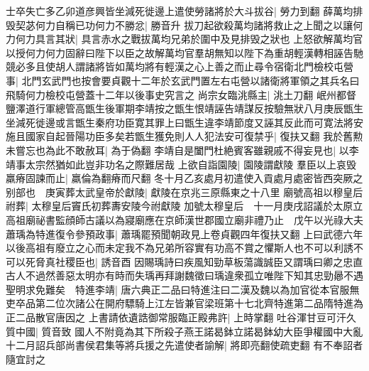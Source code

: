 士卒失亡多乙卯道彦興皆坐減死徙邊上遣使勞諸將於大斗拔谷|{
	勞力到翻}
薛萬均排毁契苾何力自稱已功何力不勝忿|{
	勝音升}
拔刀起欲殺萬均諸將救止之上聞之以讓何力何力具言其狀|{
	具言赤水之戰拔萬均兄弟於圍中及見排毁之狀也}
上怒欲解萬均官以授何力何力固辭曰陛下以臣之故解萬均官羣胡無知以陛下為重胡輕漢轉相誣告馳競必多且使胡人謂諸將皆如萬均將有輕漢之心上善之而止尋令宿衛北門檢校屯營事|{
	北門玄武門也按會要貞觀十二年於玄武門置左右屯營以諸衛將軍領之其兵名曰飛騎何力檢校屯營蓋十二年以後事史究言之}
尚宗女臨洮縣主|{
	洮土刀翻}
岷州都督鹽澤道行軍總管高甑生後軍期李靖按之甑生恨靖誣告靖謀反按驗無狀八月庚辰甑生坐減死徙邊或言甑生秦府功臣寛其罪上曰甑生違李靖節度又誣其反此而可寛法將安施且國家自起晉陽功臣多矣若甑生獲免則人人犯法安可復禁乎|{
	復扶又翻}
我於舊勲未嘗忘也為此不敢赦耳|{
	為于偽翻}
李靖自是闔門杜絶賓客雖親戚不得妄見也|{
	以李靖事太宗然猶如此豈非功名之際難居哉}
上欲自詣園陵|{
	園陵謂獻陵}
羣臣以上哀毁羸瘠固諫而止|{
	羸倫為翻瘠而尺翻}
冬十月乙亥處月初遣使入貢處月處密皆西突厥之别部也　庚寅葬太武皇帝於獻陵|{
	獻陵在京兆三原縣東之十八里}
廟號高祖以穆皇后祔葬|{
	太穆皇后竇氏初葬夀安陵今祔獻陵}
加號太穆皇后　十一月庚戌詔議於太原立高祖廟祕書監顔師古議以為寢廟應在京師漢世郡國立廟非禮乃止　戊午以光祿大夫蕭瑀為特進復令參預政事|{
	蕭瑀罷預聞朝政見上卷貞觀四年復扶又翻}
上曰武德六年以後高祖有廢立之心而未定我不為兄弟所容實有功高不賞之懼斯人也不可以利誘不可以死脅真社稷臣也|{
	誘音酉}
因賜瑀詩曰疾風知勁草板蕩識誠臣又謂瑀曰卿之忠直古人不過然善惡太明亦有時而失瑀再拜謝魏徵曰瑀違衆孤立唯陛下知其忠勁曏不遇聖明求免難矣　特進李靖|{
	唐六典正二品曰特進注曰二漢及魏以為加官從本官服無吏卒品第二位次諸公在開府驃騎上江左皆兼官梁班第十七北齊特進第二品隋特進為正二品散官唐因之}
上書請依遺誥御常服臨正殿弗許|{
	上時掌翻}
吐谷渾甘豆可汗久質中國|{
	質音致}
國人不附竟為其下所殺子燕王諾曷鉢立諾曷鉢幼大臣爭權國中大亂十二月詔兵部尚書侯君集等將兵援之先遣使者諭解|{
	將即亮翻使疏吏翻}
有不奉詔者隨宜討之

